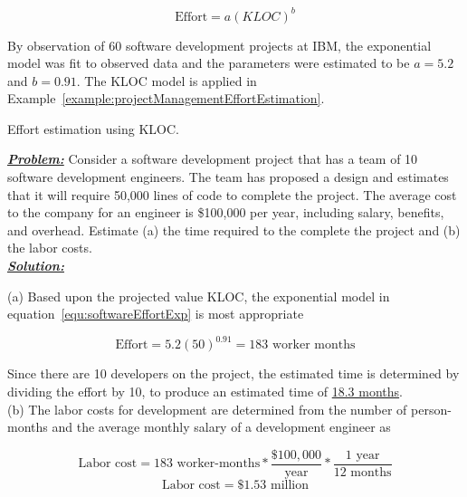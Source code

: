 \begin{equation}
\label{equ:softwareEffortExp}
\text{Effort} = a(KLOC)^b
\end{equation}

By observation of 60 software development projects at IBM, the
exponential model was fit to observed data and the parameters were
estimated to be $a=5.2$ and $b = 0.91$. The KLOC model is
applied in Example~\ref{example:projectManagementEffortEstimation}.

\begin{example}{Effort estimation using KLOC.}
\label{example:projectManagementEffortEstimation}

\emph{\textbf{\ul{Problem:}}} Consider a software development project
that has a team of 10 software development engineers. The team has
proposed a design and estimates that it will require 50,000 lines of
code to complete the project. The average cost to the company for an
engineer is \$100,000 per year, including salary, benefits, and
overhead. Estimate (a) the time required to the complete the project and
(b) the labor costs. \\

\emph{\textbf{\ul{Solution:}}}

(a) Based upon the projected value KLOC, the exponential model in
equation~\ref{equ:softwareEffortExp} is
most appropriate

$$\text{Effort} = 5.2(50)^{0.91} = 183 \text{ worker months}$$

Since there are 10 developers on the project, the estimated time is
determined by dividing the effort by 10, to produce an estimated time of
\ul{18.3 months}.\\

(b) The labor costs for development are determined from the number of
person-months and the average monthly salary of a development engineer
as

$$\text{Labor cost} = \text{183 worker-months}  * \frac{\$100,000}{\text{year}} * \frac{\text{1 year}}{\text{12 months}}$$
$$\text{Labor cost} = \$1.53 \text{ million}$$
\end{example}

